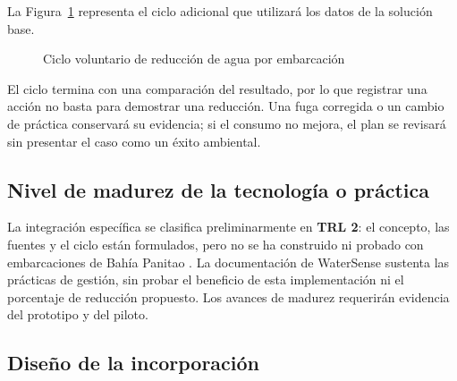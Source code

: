 La Figura~\ref{fig:inn5-plan} representa el ciclo adicional que utilizará los datos de la solución base.

\begin{figure}[H]
  \centering
  \caption{Ciclo voluntario de reducción de agua por embarcación}
  \label{fig:inn5-plan}
\end{figure}

El ciclo termina con una comparación del resultado, por lo que registrar una acción no basta para demostrar una reducción. Una fuga corregida o un cambio de práctica conservará su evidencia; si el consumo no mejora, el plan se revisará sin presentar el caso como un éxito ambiental.

\subsection{Nivel de madurez de la tecnología o práctica}

La integración específica se clasifica preliminarmente en \textbf{TRL 2}: el concepto, las fuentes y el ciclo están formulados, pero no se ha construido ni probado con embarcaciones de Bahía Panitao \parencite{nasa-trl}. La documentación de WaterSense sustenta las prácticas de gestión, sin probar el beneficio de esta implementación ni el porcentaje de reducción propuesto. Los avances de madurez requerirán evidencia del prototipo y del piloto.

\subsection{Diseño de la incorporación}


